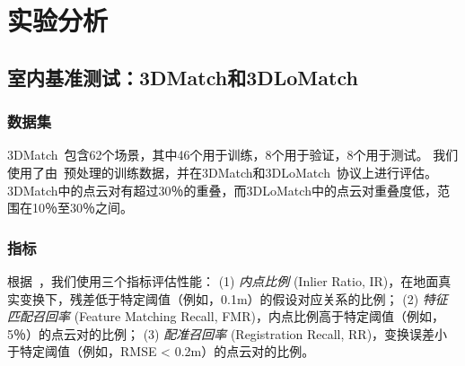 %
%
%
%
%
%

\chapter{实验分析}
\section{室内基准测试：3DMatch和3DLoMatch}
\label{sec:exp-indoor}

\subsection{数据集}
3DMatch~\cite{zeng20173dmatch}包含62个场景，其中46个用于训练，8个用于验证，8个用于测试。
我们使用了由~\cite{huang2021predator}预处理的训练数据，并在3DMatch和3DLoMatch~\cite{huang2021predator}协议上进行评估。
3DMatch中的点云对有超过30％的重叠，而3DLoMatch中的点云对重叠度低，范围在10％至30％之间。

\subsection{指标}
根据~\cite{bai2020d3feat,huang2021predator}，我们使用三个指标评估性能：
(1) \emph{内点比例} (Inlier Ratio, IR)，在地面真实变换下，残差低于特定阈值（例如，0.1m）的假设对应关系的比例；
(2) \emph{特征匹配召回率} (Feature Matching Recall, FMR)，内点比例高于特定阈值（例如，5％）的点云对的比例；
(3) \emph{配准召回率} (Registration Recall, RR)，变换误差小于特定阈值（例如，RMSE < 0.2m）的点云对的比例。


